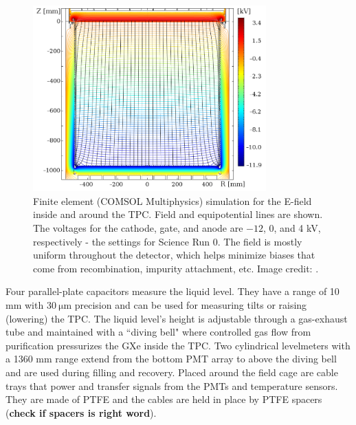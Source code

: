 \egroup

\begin{figure}
\centering
\includegraphics[width=0.8\textwidth]{ElectricField}
\caption{Finite element (COMSOL Multiphysics) simulation for the E-field inside and around the TPC.  Field and equipotential lines are
shown.  The voltages for the cathode, gate, and anode are $-12$, 0, and 4 kV, respectively - the settings for Science Run 0.  The field
is mostly uniform throughout the detector, which helps minimize biases that come from recombination, impurity attachment, etc.  Image
credit: .}
\label{fig:xenon1t_tpc_efield}
\end{figure}

Four parallel-plate capacitors measure the liquid level.  They have a range of 10 mm with $30\ \mathrm{\mu m}$ precision and can be used
for measuring tilts or raising (lowering) the TPC.  The liquid level's height is adjustable through a gas-exhaust tube and maintained
with a ``diving bell" where controlled gas flow from purification pressurizes the GXe inside the TPC.  Two cylindrical levelmeters
with a 1360 mm range extend from the bottom PMT array to above the diving bell and are used during filling and recovery.  Placed around
the field cage are cable trays that power and transfer signals from the PMTs and temperature sensors.  They are made of PTFE and the
cables are held in place by PTFE spacers (\textbf{check if spacers is right word}).



